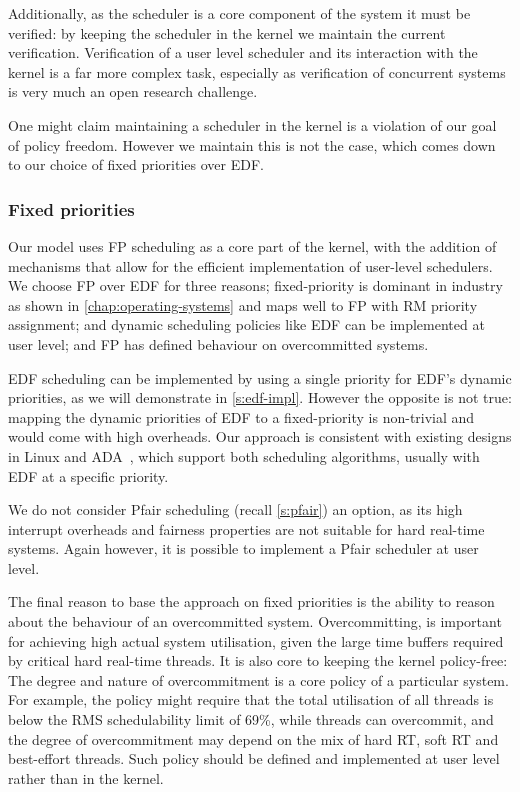 Additionally, as the scheduler is a core component of the system it must be verified: by keeping the
scheduler in the kernel we maintain the current verification. Verification of a user level scheduler
and its interaction with the kernel is a far more complex task, especially as verification of
concurrent systems is very much an open research challenge. 

One might claim maintaining a scheduler in the kernel is a violation of our goal of policy freedom.
However we maintain this is not the case, which comes down to our choice of fixed priorities over
\gls{EDF}.

\subsubsection{Fixed priorities}

Our model uses \gls{FP} scheduling as a core part of the kernel, with the addition of mechanisms
that allow for the efficient implementation of user-level schedulers.
We choose \gls{FP} over \gls{EDF} for three reasons; 
fixed-priority is dominant in industry
as shown in \cref{chap:operating-systems} and maps well to \gls{FP} with \gls{RM} priority assignment; and dynamic scheduling policies like
\gls{EDF} can be implemented at user level; and \gls{FP} has defined behaviour on overcommitted
systems.

\gls{EDF} scheduling can be implemented by using a single priority for EDF's dynamic priorities, as we
will demonstrate in \cref{s:edf-impl}.
However the opposite is not true: mapping the dynamic priorities of EDF to a fixed-priority
is non-trivial and would come with high overheads. 
Our approach is consistent with existing designs in Linux  and ADA~\citep{Burns_Wellings:crtpa}, which
support both scheduling algorithms, usually with \gls{EDF} at a specific priority.

We do not consider Pfair scheduling (recall \cref{s:pfair}) an option, as its high interrupt
overheads and fairness properties are not suitable for hard real-time systems.  Again however, it is
possible to implement a Pfair scheduler at user level.

The final reason to base the approach on fixed priorities is the ability
to reason about the behaviour of an
overcommitted system. Overcommitting, is important for achieving high
actual system utilisation, given the large time buffers required by
critical hard real-time threads. It is also core to keeping the kernel
policy-free: The degree and nature of overcommitment is a core policy
of a particular system. For example, the policy might require that the
total utilisation of all  threads is below the RMS
schedulability limit of 69\%, while  threads can overcommit,
and the degree of overcommitment may depend on the mix of hard RT,
soft RT and best-effort threads. Such policy should be defined and
implemented at user level rather than in the kernel.

